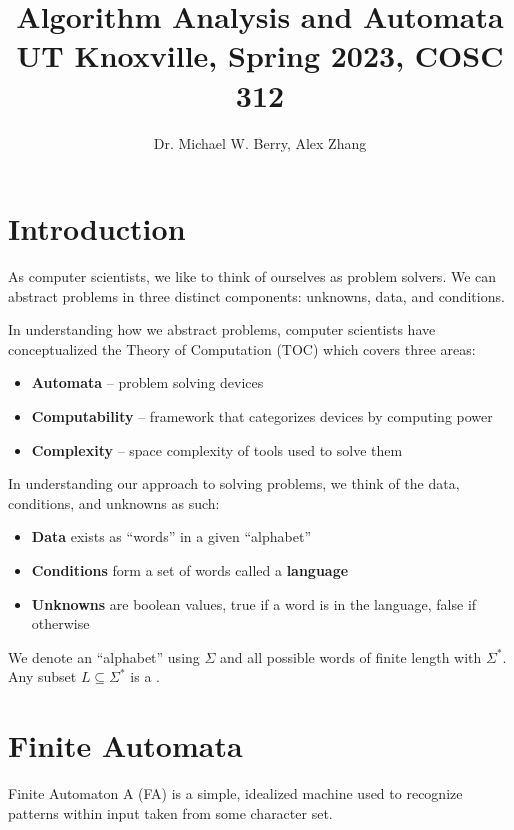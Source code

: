 \documentclass[12pt]{report}
\title{\textbf{Algorithm Analysis and Automata}\\
\large UT Knoxville, Spring 2023, COSC 312}
\author{Dr. Michael W. Berry, Alex Zhang}
\begin{document}
\maketitle
\tableofcontents

\chapter{Introduction}
As computer scientists, we like to think of ourselves as problem solvers. We can abstract problems in three distinct components: unknowns, data, and conditions.

In understanding how we abstract problems, computer scientists have conceptualized the Theory of Computation (TOC) which covers three areas:
\begin{itemize}
    \item \textbf{Automata} -- problem solving devices
    \item \textbf{Computability} -- framework that categorizes devices by computing power
    \item \textbf{Complexity} -- space complexity of tools used to solve them
\end{itemize}

In understanding our approach to solving problems, we think of the data, conditions, and unknowns as such:
\begin{itemize}
    \item \textbf{Data} exists as ``words'' in a given ``alphabet''
    \item \textbf{Conditions} form a set of words called a \textbf{language}
    \item \textbf{Unknowns} are boolean values, true if a word is in the language, false if otherwise
\end{itemize}

We denote an ``alphabet'' using $\Sigma$ and all possible words of finite length with $\Sigma^*$. Any subset $L \subseteq \Sigma^*$ is a .

\chapter{Finite Automata}

\begin{dfnbox}{Finite Automaton}{}
    A  (FA) is a simple, idealized machine used to recognize patterns within input taken from some character set.
\end{dfnbox}
\end{document}

